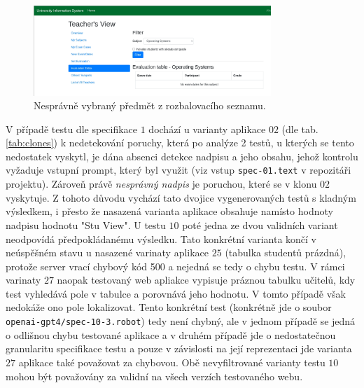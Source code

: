 \documentclass[czech, ma, kiv, he, iso690alph, pdf, viewonly]{fasthesis}
\begin{document}
            \begin{figure}
                \includegraphics[width=0.8\textwidth]{pic/wrong_subject_select.png}
                \centering
                \caption{Nesprávně vybraný předmět z rozbalovacího seznamu.}
                \label{fig:wrong_subject_select}
            \end{figure}

            V případě testu dle specifikace \(1\) dochází u varianty aplikace \(02\) (dle tab. \ref{tab:clones}) k nedetekování poruchy, která po analýze 2 testů, u kterých se tento nedostatek vyskytl, je dána absenci detekce nadpisu a jeho obsahu, jehož kontrolu vyžaduje vstupní prompt, který byl využit (viz vstup \verb|spec-01.text| v repozitáři projektu). Zároveň právě \textit{nesprávný nadpis} je poruchou, které se v klonu \(02\) vyskytuje. Z tohoto důvodu vychází tato dvojice vygenerovaných testů s kladným výsledkem, i přesto že nasazená varianta aplikace obsahuje namísto hodnoty nadpisu  hodnotu "Stu View". U testu \(10\) poté jedna ze dvou validních variant neodpovídá předpokládanému výsledku. Tato konkrétní varianta končí v neúspěšném stavu u nasazené varinaty aplikace \(25\) (tabulka studentů prázdná), protože server vrací chybový kód 500 a nejedná se tedy o chybu testu. V rámci varinaty \(27\) naopak testovaný web apliakce vypisuje práznou tabulku učitelů, kdy test vyhledává pole v tabulce a porovnává jeho hodnotu. V tomto případě však nedokáže ono pole lokalizovat. Tento konkrétní test (konkrétně jde o soubor \verb|openai-gpt4/spec-10-3.robot|) tedy není chybný, ale v jednom případě se jedná o odlišnou chybu testované aplikace a v druhém případě jde o nedostatečnou granularitu specifikace testu a pouze v závislosti na její reprezentaci jde varianta \(27\) aplikace také považovat za chybovou. Obě nevyfiltrované varianty testu \(10\) mohou být považovány za validní na všech verzích testovaného webu. 

\end{document}
